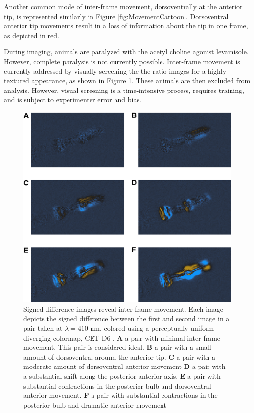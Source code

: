 Another common mode of inter-frame movement, dorsoventrally at the anterior tip, is represented similarly in Figure \ref{fig:MovementCartoon}. Dorsoventral anterior tip movements result in a loss of information about the tip in one frame, as depicted in red.

During imaging, animals are paralyzed with the acetyl choline agonist levamisole. However, complete paralysis is not currently possible. Inter-frame movement is currently addressed by visually screening the the ratio images for a highly textured appearance, as shown in Figure \ref{fig:HighMovement}. These animals are then excluded from analysis. However, visual screening is a time-intensive process, requires training, and is subject to experimenter error and bias.

\begin{figure}[ht]
    \centering
    \includegraphics[scale=0.5]{Figures/rendered_files/movement_difference_images}
    \decoRule
    \caption[Difference images reveal movement]{Signed difference images reveal inter-frame movement. Each image depicts the signed difference between the first and second image in a pair taken at $\lambda = 410 \text{ nm}$, colored using a perceptually-uniform diverging colormap, CET-D6 \cite{kovesi2015}. \textbf{A} a pair with minimal inter-frame movement. This pair is considered ideal. \textbf{B} a pair with a small amount of dorsoventral around the anterior tip. \textbf{C} a pair with a moderate amount of dorsoventral anterior movement \textbf{D} a pair with a substantial shift along the posterior-anterior axis. \textbf{E} a pair with substantial contractions in the posterior bulb and dorsoventral anterior movement. \textbf{F} a pair with substantial contractions in the posterior bulb and dramatic anterior movement}
    \label{fig:HighMovement}
\end{figure}

